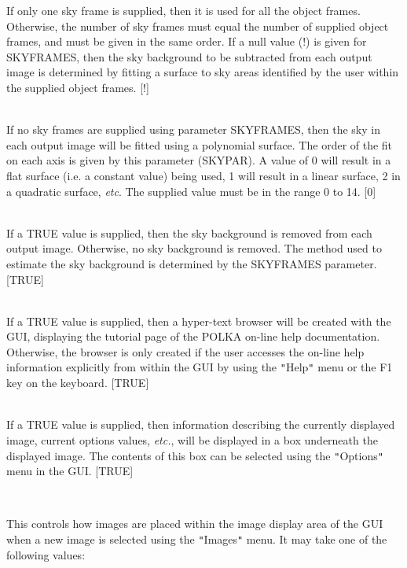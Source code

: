 \documentclass[twoside,11pt]{article}
\renewcommand{\_}{\texttt{\symbol{95}}}
\newcommand{\sstsubsection}[1]{ \item[{#1}] \mbox{} \\}
\newcommand{\sstitemlist}[1]{
  \mbox{} \\
  \vspace{-3.5ex}
  \begin{itemize}
     #1
  \end{itemize}
}
\newcommand{\sstsubsection}[1]{\item[{#1}]}
\newcommand{\sstitemlist}[1]{
      \begin{itemize}
         #1
      \end{itemize}
      \\
   }
\begin{document}
{{{         If only one sky frame is supplied, then it is used for all the object
         frames. Otherwise, the number of sky frames must equal the number of
         supplied object frames, and must be given in the same order. If a
         null value (!) is given for SKYFRAMES, then the sky background to be
         subtracted from each output image is determined by fitting a surface
         to sky areas identified by the user within the supplied object
         frames. [!]
      }
      \sstsubsection{
         SKYPAR = \_INTEGER (Update)
      }{
         If no sky frames are supplied using parameter SKYFRAMES, then
         the sky in each output image will be fitted using a polynomial
         surface. The order of the fit on each axis is given by this
         parameter (SKYPAR). A value of 0 will result in a flat surface
         (i.e. a constant value) being used, 1 will result in a linear
         surface, 2 in a quadratic surface, \emph{etc}. The supplied value
         must be in the range 0 to 14. [0]
      }
      \sstsubsection{
         SKYOFF = \_LOGICAL (Update)
      }{
         If a TRUE value is supplied, then the sky background is removed
         from each output image. Otherwise, no sky background is removed.
         The method used to estimate the sky background is determined by
         the SKYFRAMES parameter. [TRUE]
      }
      \sstsubsection{
         STARTHELP = \_LOGICAL (Read)
      }{
         If a TRUE value is supplied, then a hyper-text browser will be
         created with the GUI, displaying the tutorial page of the POLKA
         on-line help documentation. Otherwise, the browser is only created
         if the user accesses the on-line help information explicitly
         from within the GUI by using the {\tt "}Help{\tt "} menu or the F1 key on
         the keyboard. [TRUE]
      }
      \sstsubsection{
         STATUSAREA = \_LOGICAL (Update)
      }{
         If a TRUE value is supplied, then information describing the
         currently displayed image, current options values, \emph{etc.}, will be
         displayed in a box underneath the displayed image. The contents
         of this box can be selected using the {\tt "}Options{\tt "} menu in the GUI.
         [TRUE]
      }
      \sstsubsection{
         VIEW = LITERAL (Update)
      }{
         This controls how images are placed within the image display
         area of the GUI when a new image is selected using the {\tt "}Images{\tt "}
         menu. It may take one of the following values:
         \sstitemlist{

}}}}
\end{document}
